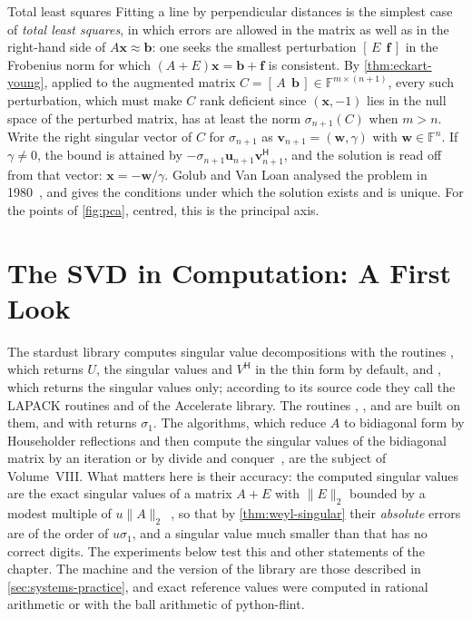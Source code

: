 \begin{note}{Total least squares}
Fitting a line by perpendicular distances is the simplest case of \emph{total least squares}, in which errors are allowed in the matrix as well as in the right-hand side of $A\mathbf x\approx\mathbf b$: one seeks the smallest perturbation $[\,E\ \ \mathbf f\,]$ in the Frobenius norm for which $(A+E)\mathbf x=\mathbf b+\mathbf f$ is consistent. By \cref{thm:eckart-young}, applied to the augmented matrix $C=[\,A\ \ \mathbf b\,]\in\mathbb F^{m\times(n+1)}$, every such perturbation, which must make $C$ rank deficient since $(\mathbf x,-1)$ lies in the null space of the perturbed matrix, has at least the norm $\sigma_{n+1}(C)$ when $m>n$. Write the right singular vector of $C$ for $\sigma_{n+1}$ as $\mathbf v_{n+1}=(\mathbf w,\gamma)$ with $\mathbf w\in\mathbb F^n$. If $\gamma\ne0$, the bound is attained by $-\sigma_{n+1}\mathbf u_{n+1}\mathbf v_{n+1}^{\mathsf H}$, and the solution is read off from that vector: $\mathbf x=-\mathbf w/\gamma$. Golub and Van Loan analysed the problem in 1980~\cite{golubvanloan1980}, and \cite[Sect.~6.3]{golub2013} gives the conditions under which the solution exists and is unique. For the points of \cref{fig:pca}, centred, this is the principal axis.
\end{note}

\section{The SVD in Computation: A First Look}
\label{sec:svd-computation}

The stardust library computes singular value decompositions with the routines , which returns $U$, the singular values and $V^{\mathsf H}$ in the thin form by default, and , which returns the singular values only; according to its source code they call the LAPACK routines  and  of the Accelerate library. The routines , ,  and  are built on them, and  with  returns $\sigma_1$. The algorithms, which reduce $A$ to bidiagonal form by Householder reflections and then compute the singular values of the bidiagonal matrix by an iteration or by divide and conquer~\cite{golubkahan1965,golubreinsch1970}, are the subject of Volume~VIII. What matters here is their accuracy: the computed singular values are the exact singular values of a matrix $A+E$ with $\|E\|_2$ bounded by a modest multiple of $u\|A\|_2$~\cite[Sect.~8.6]{golub2013}, so that by \cref{thm:weyl-singular} their \emph{absolute} errors are of the order of $u\sigma_1$, and a singular value much smaller than that has no correct digits. The experiments below test this and other statements of the chapter. The machine and the version of the library are those described in \cref{sec:systems-practice}, and exact reference values were computed in rational arithmetic or with the ball arithmetic of python-flint.

